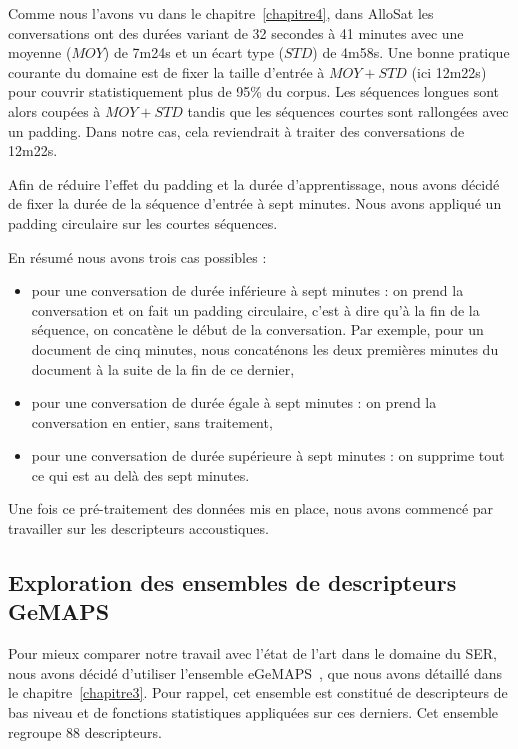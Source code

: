 Comme nous l'avons vu dans le chapitre~\ref{chapitre4}, dans AlloSat les conversations ont des durées variant de 32 secondes à 41 minutes avec une moyenne ($MOY$) de 7m24s et un écart type ($STD$) de 4m58s. Une bonne pratique courante du domaine est de fixer la taille d'entrée à $MOY + STD$ (ici 12m22s) pour couvrir statistiquement plus de 95\% du corpus. Les séquences longues sont alors coupées à $MOY + STD$ tandis que les séquences courtes sont rallongées avec un padding. Dans notre cas, cela reviendrait à traiter des conversations de 12m22s.

Afin de réduire l'effet du padding et la durée d'apprentissage, nous avons décidé de fixer la durée de la séquence d'entrée à sept minutes. Nous avons appliqué un padding circulaire sur les courtes séquences.

En résumé nous avons trois cas possibles :
\begin{itemize}
  \item pour une conversation de durée inférieure à sept minutes : on prend la conversation et on fait un padding circulaire, c'est à dire qu'à la fin de la séquence, on concatène le début de la conversation. Par exemple, pour un document de cinq minutes, nous concaténons les deux premières minutes du document à la suite de la fin de ce dernier,
  \item pour une conversation de durée égale à sept minutes : on prend la conversation en entier, sans traitement,
  \item pour une conversation de durée supérieure à sept minutes : on supprime tout ce qui est au delà des sept minutes.
\end{itemize}

Une fois ce pré-traitement des données mis en place, nous avons commencé par travailler sur les descripteurs accoustiques.

\subsection{Exploration des ensembles de descripteurs GeMAPS}
Pour mieux comparer notre travail avec l'état de l'art dans le domaine du SER, nous avons décidé d'utiliser l'ensemble eGeMAPS~\cite{Eyben2016}, que nous avons détaillé dans le chapitre~\ref{chapitre3}. Pour rappel, cet ensemble est constitué de descripteurs de bas niveau et de fonctions statistiques appliquées sur ces derniers. Cet ensemble regroupe 88 descripteurs.

